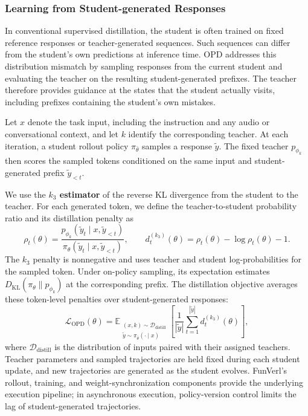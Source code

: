 \documentclass{article}
\begin{document}
\subsubsection{Learning from Student-generated Responses}
\label{subsubsec:opd-objective}

In conventional supervised distillation, the student is often trained on fixed reference responses or teacher-generated sequences. Such sequences can differ from the student's own predictions at inference time. OPD addresses this distribution mismatch by sampling responses from the current student and evaluating the teacher on the resulting student-generated prefixes. The teacher therefore provides guidance at the states that the student actually visits, including prefixes containing the student's own mistakes.

Let $x$ denote the task input, including the instruction and any audio or conversational context, and let $k$ identify the corresponding teacher. At each iteration, a student rollout policy $\pi_{\bar\theta}$ samples a response $\tilde y$. The fixed teacher $p_{\phi_k}$ then scores the sampled tokens conditioned on the same input and student-generated prefix $\tilde y_{<t}$.

We use the \textbf{$k_3$ estimator} of the reverse KL divergence from the student to the teacher. For each generated token, we define the teacher-to-student probability ratio and its distillation penalty as
\begin{equation}
\label{eq:opd-k3}
\rho_t(\theta)=\frac{p_{\phi_k}(\tilde y_t\mid x,\tilde y_{<t})}
{\pi_\theta(\tilde y_t\mid x,\tilde y_{<t})},
\qquad
d_t^{(k_3)}(\theta)=\rho_t(\theta)-\log\rho_t(\theta)-1.
\end{equation}
The $k_3$ penalty is nonnegative and uses teacher and student log-probabilities for the sampled token. Under on-policy sampling, its expectation estimates $D_{\mathrm{KL}}(\pi_\theta\|p_{\phi_k})$ at the corresponding prefix. The distillation objective averages these token-level penalties over student-generated responses:
\begin{equation}
\label{eq:opd-objective}
\mathcal{L}_{\mathrm{OPD}}(\theta)
=\mathbb{E}_{\substack{(x,k)\sim\mathcal{D}_{\mathrm{distill}}\\
\tilde y\sim\pi_{\bar\theta}(\cdot\mid x)}}
\left[\frac{1}{|\tilde y|}\sum_{t=1}^{|\tilde y|}d_t^{(k_3)}(\theta)\right],
\end{equation}
where $\mathcal{D}_{\mathrm{distill}}$ is the distribution of inputs paired with their assigned teachers. Teacher parameters and sampled trajectories are held fixed during each student update, and new trajectories are generated as the student evolves. FunVerl's rollout, training, and weight-synchronization components provide the underlying execution pipeline; in asynchronous execution, policy-version control limits the lag of student-generated trajectories.
\end{document}
